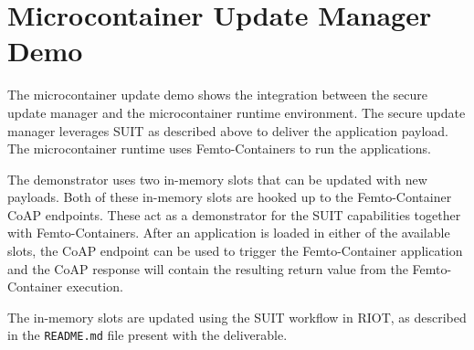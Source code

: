 \documentclass[../main.tex]{subfiles}
\begin{document}
	

\section{Microcontainer Update Manager Demo}

The microcontainer update demo shows the integration between the secure update
manager and the microcontainer runtime environment.
The secure update manager leverages SUIT as described above to deliver the
application payload.
The microcontainer runtime uses Femto-Containers to run the applications.

The demonstrator uses two in-memory slots that can be updated with new payloads.
Both of these in-memory slots are hooked up to the Femto-Container CoAP
endpoints. These act as a demonstrator for the SUIT capabilities together with
Femto-Containers. After an application is loaded in either of the available
slots, the CoAP endpoint can be used to trigger the Femto-Container application
and the CoAP response will contain the resulting return value from the
Femto-Container execution.

The in-memory slots are updated using the SUIT workflow in RIOT, as described in
the \texttt{README.md} file present with the deliverable.

	
\end{document}
